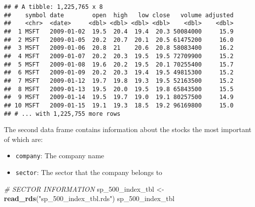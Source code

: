 \documentclass[
]{article}
\newenvironment{Shaded}{\begin{snugshade}}{\end{snugshade}}
\newcommand{\CommentTok}[1]{\textcolor[rgb]{0.56,0.35,0.01}{\textit{#1}}}
\newcommand{\DecValTok}[1]{\textcolor[rgb]{0.00,0.00,0.81}{#1}}
\newcommand{\KeywordTok}[1]{\textcolor[rgb]{0.13,0.29,0.53}{\textbf{#1}}}
\newcommand{\NormalTok}[1]{#1}
\newcommand{\StringTok}[1]{\textcolor[rgb]{0.31,0.60,0.02}{#1}}
\providecommand{\tightlist}{%
  \setlength{\itemsep}{0pt}\setlength{\parskip}{0pt}}
\begin{document}
\begin{verbatim}
## # A tibble: 1,225,765 x 8
##    symbol date        open  high   low close   volume adjusted
##    <chr>  <date>     <dbl> <dbl> <dbl> <dbl>    <dbl>    <dbl>
##  1 MSFT   2009-01-02  19.5  20.4  19.4  20.3 50084000     15.9
##  2 MSFT   2009-01-05  20.2  20.7  20.1  20.5 61475200     16.0
##  3 MSFT   2009-01-06  20.8  21    20.6  20.8 58083400     16.2
##  4 MSFT   2009-01-07  20.2  20.3  19.5  19.5 72709900     15.2
##  5 MSFT   2009-01-08  19.6  20.2  19.5  20.1 70255400     15.7
##  6 MSFT   2009-01-09  20.2  20.3  19.4  19.5 49815300     15.2
##  7 MSFT   2009-01-12  19.7  19.8  19.3  19.5 52163500     15.2
##  8 MSFT   2009-01-13  19.5  20.0  19.5  19.8 65843500     15.5
##  9 MSFT   2009-01-14  19.5  19.7  19.0  19.1 80257500     14.9
## 10 MSFT   2009-01-15  19.1  19.3  18.5  19.2 96169800     15.0
## # ... with 1,225,755 more rows
\end{verbatim}

The second data frame contains information about the stocks the most
important of which are:

\begin{itemize}
\tightlist
\item
  \texttt{company}: The company name
\item
  \texttt{sector}: The sector that the company belongs to
\end{itemize}

\begin{Shaded}
\begin{Highlighting}[]
\CommentTok{# SECTOR INFORMATION}
\NormalTok{sp_}\DecValTok{500}\NormalTok{_index_tbl <-}\StringTok{ }\KeywordTok{read_rds}\NormalTok{(}\StringTok{"sp_500_index_tbl.rds"}\NormalTok{)}
\NormalTok{sp_}\DecValTok{500}\NormalTok{_index_tbl}
\end{Highlighting}
\end{Shaded}
\end{document}
